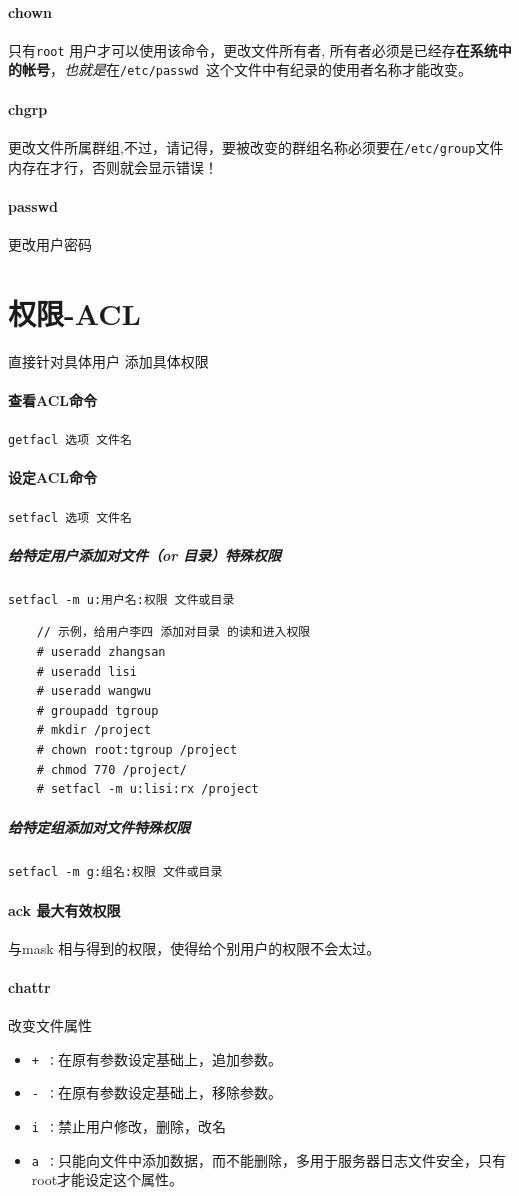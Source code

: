 \documentclass[UTF8,a4paper,12pt]{ctexbook}
\begin{document}
		 \paragraph{chown}只有\verb|root| 用户才可以使用该命令，更改文件所有者, 所有者必须是已经存\textbf{在系统中的帐号}，\textit{也就是}在\verb|/etc/passwd |这个文件中有纪录的使用者名称才能改变。
		 \paragraph{chgrp}更改文件所属群组,不过，请记得，要被改变的群组名称必须要在\verb|/etc/group|文件内存在才行，否则就会显示错误！
		 \paragraph{passwd}更改用户密码
	\section{权限-ACL}
		直接针对具体用户 添加具体权限
		
		\paragraph{查看ACL命令} \verb|getfacl 选项 文件名|
		
		\paragraph{设定ACL命令} \verb|setfacl 选项 文件名|
		
			\subparagraph{给特定用户添加对文件（or 目录）特殊权限}\verb|setfacl -m u:用户名:权限 文件或目录|
				\begin{lstlisting}
	// 示例，给用户李四 添加对目录 的读和进入权限
	# useradd zhangsan
	# useradd lisi
	# useradd wangwu
	# groupadd tgroup
	# mkdir /project
	# chown root:tgroup /project
	# chmod 770 /project/
	# setfacl -m u:lisi:rx /project
				\end{lstlisting}
	
			\subparagraph{给特定组添加对文件特殊权限}\verb|setfacl -m g:组名:权限 文件或目录|
		
		\paragraph{ack 最大有效权限}与mask 相与得到的权限，使得给个别用户的权限不会太过。
		
		 \paragraph{chattr} 改变文件属性
			 	\begin{itemize}
			 		\item \verb|+ ：|在原有参数设定基础上，追加参数。
			 		\item \verb|- ：|在原有参数设定基础上，移除参数。
			 		\item \verb|i ：|禁止用户修改，删除，改名
			 		\item \verb|a ：|只能向文件中添加数据，而不能删除，多用于服务器日志文件安全，只有root才能设定这个属性。
			 	\end{itemize}
			 	
\end{document}
